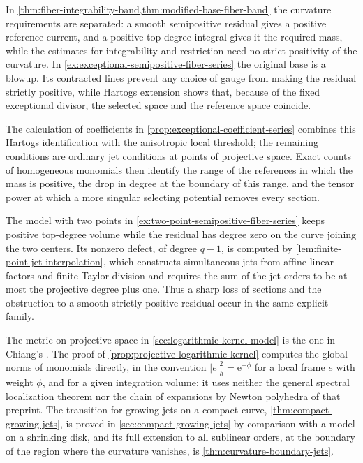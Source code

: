In \cref{thm:fiber-integrability-band,thm:modified-base-fiber-band} the curvature requirements are separated: a smooth semipositive residual gives a positive reference current, and a positive top-degree integral gives it the required mass, while the estimates for integrability and restriction need no strict positivity of the curvature. In \cref{ex:exceptional-semipositive-fiber-series} the original base is a blowup. Its contracted lines prevent any choice of gauge from making the residual strictly positive, while Hartogs extension shows that, because of the fixed exceptional divisor, the selected space and the reference space coincide.

The calculation of coefficients in \cref{prop:exceptional-coefficient-series} combines this Hartogs identification with the anisotropic local threshold; the remaining conditions are ordinary jet conditions at points of projective space. Exact counts of homogeneous monomials then identify the range of the references in which the mass is positive, the drop in degree at the boundary of this range, and the tensor power at which a more singular selecting potential removes every section.

The model with two points in \cref{ex:two-point-semipositive-fiber-series} keeps positive top-degree volume while the residual has degree zero on the curve joining the two centers. Its nonzero defect, of degree $q-1$, is computed by \cref{lem:finite-point-jet-interpolation}, which constructs simultaneous jets from affine linear factors and finite Taylor division and requires the sum of the jet orders to be at most the projective degree plus one. Thus a sharp loss of sections and the obstruction to a smooth strictly positive residual occur in the same explicit family.

The metric on projective space in \cref{sec:logarithmic-kernel-model} is the one in Chiang's \cite[v1, Example~I.15, pp.~9--10]{ChiangKernel26}. The proof of \cref{prop:projective-logarithmic-kernel} computes the global norms of monomials directly, in the convention $|e|_h^2=\mathrm e^{-\phi}$ for a local frame $e$ with weight $\phi$, and for a given integration volume; it uses neither the general spectral localization theorem nor the chain of expansions by Newton polyhedra of that preprint. The transition for growing jets on a compact curve, \cref{thm:compact-growing-jets}, is proved in \cref{sec:compact-growing-jets} by comparison with a model on a shrinking disk, and its full extension to all sublinear orders, at the boundary of the region where the curvature vanishes, is \cref{thm:curvature-boundary-jets}.

